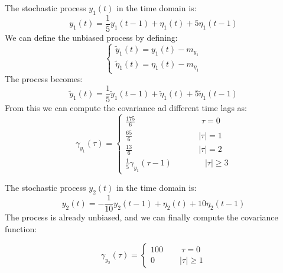 The stochastic process $y_1(t)$ in the time domain is: 
\[y_1(t)=\dfrac{1}{5}y_1(t-1)+\eta_1(t)+5\eta_1(t-1)\]
We can define the unbiased process by defining: 
\[\begin{cases}
    \tilde{y}_1(t)=y_1(t)-m_{y_1}\\
    \tilde{\eta}_1(t)=\eta_1(t)-m_{\eta_1}
\end{cases}\]
The process becomes: 
\[\tilde{y}_1(t)=\dfrac{1}{5}\tilde{y}_1(t-1)+\tilde{\eta}_1(t)+5\tilde{\eta}_1(t-1)\]
From this we can compute the covariance ad different time lags as: 
\[\gamma_{y_1}(\tau)=\begin{cases}
    \frac{175}{6} \qquad\qquad\qquad\qquad \tau=0 \\
    \frac{65}{6} \qquad\qquad\qquad\qquad \left\lvert \tau\right\rvert =1 \\
    \frac{13}{6} \qquad\qquad\qquad\qquad \left\lvert \tau\right\rvert =2 \\
    \frac{1}{5}\gamma_{y_1}(\tau-1) \qquad\qquad \left\lvert \tau\right\rvert \geq 3 
\end{cases}\]

The stochastic process $y_2(t)$ in the time domain is: 
\[y_2(t)=-\dfrac{1}{10}y_2(t-1)+\eta_2(t)+10\eta_2(t-1)\]
The process is already unbiased, and we can finally compute the covariance function: 

\[\gamma_{y_2}(\tau)=\begin{cases}
    100 \qquad\: \tau=0 \\
    0 \qquad\quad  \left\lvert \tau\right\rvert \geq 1
\end{cases}\]